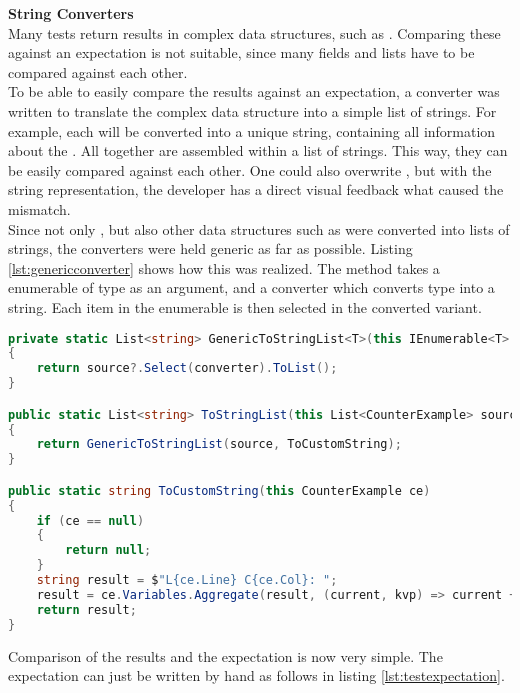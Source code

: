 \textbf{String Converters}\\
Many tests return results in complex data structures, such as .
Comparing these against an expectation is not suitable, since many fields and lists have to be compared against each other.\\

To be able to easily compare the results against an expectation,
a converter was written to translate the complex data structure into a simple list of strings.
For example, each  will be converted into a unique string, containing all information about the .
All  together are assembled within a list of strings.
This way, they can be easily compared against each other.
One could also overwrite , but with the string representation, the developer has a direct visual feedback what caused the mismatch.\\

Since not only , but also other data structures such as  were converted into lists of strings,
the converters were held generic as far as possible.
Listing \ref{lst:genericconverter} shows how this was realized.
The method takes a enumerable of type  as an argument, and a converter which converts type  into a string.
Each item in the enumerable is then selected in the converted variant.

\begin{lstlisting}[language=csharp, caption={Converting CounterExamples to a List of Strings}, captionpos=b, label={lst:genericconverter}]
private static List<string> GenericToStringList<T>(this IEnumerable<T> source, Func<T, string> converter)
{
    return source?.Select(converter).ToList();
}

public static List<string> ToStringList(this List<CounterExample> source)
{
    return GenericToStringList(source, ToCustomString);
}

public static string ToCustomString(this CounterExample ce)
{
    if (ce == null)
    {
        return null;
    }
    string result = $"L{ce.Line} C{ce.Col}: ";
    result = ce.Variables.Aggregate(result, (current, kvp) => current + $"{kvp.Key} = {kvp.Value}; ");
    return result;
}
\end{lstlisting}

Comparison of the results and the expectation is now very simple.
The expectation can just be written by hand as follows in listing \ref{lst:testexpectation}.

